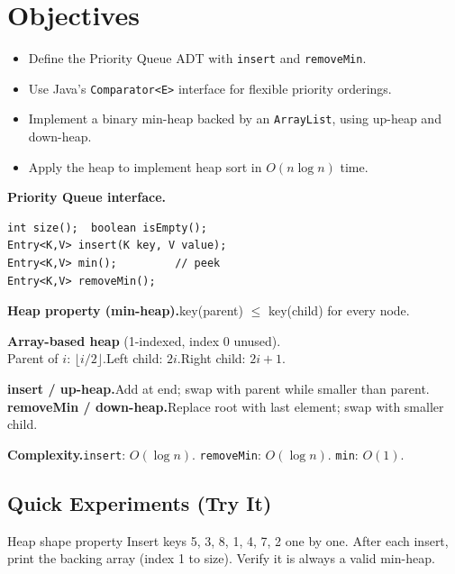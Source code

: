 \documentclass[11pt]{article}
\begin{document}
\labheader

\section*{Objectives}
\begin{itemize}[leftmargin=*,nosep]
  \item Define the Priority Queue ADT with \texttt{insert} and \texttt{removeMin}.
  \item Use Java's \texttt{Comparator<E>} interface for flexible priority orderings.
  \item Implement a binary min-heap backed by an \texttt{ArrayList}, using up-heap and down-heap.
  \item Apply the heap to implement heap sort in $O(n \log n)$ time.
\end{itemize}

\begin{summary}
\textbf{Priority Queue interface.}
\begin{lstlisting}
int size();  boolean isEmpty();
Entry<K,V> insert(K key, V value);
Entry<K,V> min();         // peek
Entry<K,V> removeMin();
\end{lstlisting}

\textbf{Heap property (min-heap).}\quad key(parent) $\leq$ key(child) for every node.

\textbf{Array-based heap} (1-indexed, index 0 unused).\\
Parent of $i$: $\lfloor i/2 \rfloor$.\quad Left child: $2i$.\quad Right child: $2i+1$.

\textbf{insert / up-heap.}\quad Add at end; swap with parent while smaller than parent.\\
\textbf{removeMin / down-heap.}\quad Replace root with last element; swap with smaller child.

\textbf{Complexity.}\quad \texttt{insert}: $O(\log n)$. \texttt{removeMin}: $O(\log n)$. \texttt{min}: $O(1)$.
\end{summary}

\subsection*{Quick Experiments (Try It)}

\begin{tryit}{Heap shape property}
Insert keys 5, 3, 8, 1, 4, 7, 2 one by one.
After each insert, print the backing array (index 1 to size).
Verify it is always a valid min-heap.
\end{tryit}
\end{document}
